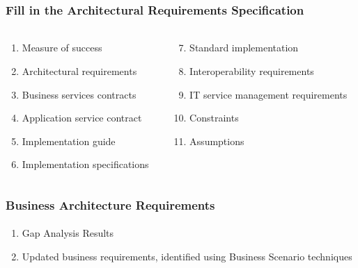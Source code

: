 \documentclass[aspectratio=169, table]{beamer}
\begin{document}
\begin{frame}
    \frametitle{Fill in the Architectural Requirements Specification}
    \framesubtitle{\hspace{1cm}}
    \begin{columns}
        \begin{column}{0.5\textwidth}
            \begin{center}
                \begin{enumerate}
                    \item Measure of success
                    \item Architectural requirements
                    \item Business services contracts
                    \item Application service contract
                    \item Implementation guide
                    \item Implementation specifications

                \end{enumerate}
            \end{center}
        \end{column}
        \begin{column}{0.5\textwidth}
            \begin{center}
                \begin{enumerate}
                    \setcounter{enumi}{6}
                    \item Standard implementation
                    \item Interoperability requirements
                    \item IT service management requirements
                    \item Constraints
                    \item Assumptions
                \end{enumerate}
            \end{center}
        \end{column}
    \end{columns}
\end{frame}

\begin{frame}
    \frametitle{Business Architecture Requirements}
     \framesubtitle{\hspace{1cm}}
    \begin{enumerate}
        \item Gap Analysis Results
        \item Updated business requirements, identified using Business Scenario techniques
    \end{enumerate}
\end{frame}
\end{document}
